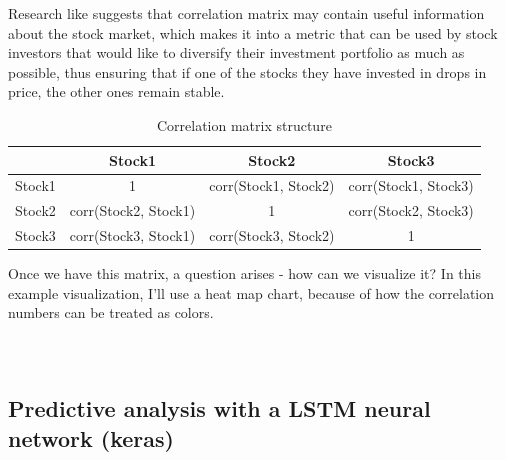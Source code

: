 \documentclass[12pt, a4paper]{article}
\begin{document}
Research like \cite{kwapien2006bulk} suggests that correlation matrix may contain useful information about the stock market, which makes it into a metric that can be used by stock investors that would like to diversify their investment portfolio as much as possible, thus ensuring that if one of the stocks they have invested in drops in price, the other ones remain stable.

\begin{table}[h!]
\centering
\caption{Correlation matrix structure}
\begin{tabular}{ | c | c | c | c | }
  \hline
  \ & Stock1 & Stock2 & Stock3 \\
  \hline
  Stock1 & 1 & corr(Stock1, Stock2) & corr(Stock1, Stock3) \\
  \hline
  Stock2 & corr(Stock2, Stock1) & 1 & corr(Stock2, Stock3) \\
  \hline
  Stock3 & corr(Stock3, Stock1) & corr(Stock3, Stock2) & 1 \\
  \hline
\end{tabular}
\label{table:corr}
\end{table}

Once we have this matrix, a question arises - how can we visualize it? In this example visualization, I'll use a heat map chart, because of how the correlation numbers can be treated as colors.

\bgroup
  \inputminted[linenos, breaklines=true, fontsize=\scriptsize]{python}{src/stocks/corr/1_get_data.py}
  \label{listing:scorr_1}
\egroup


\bgroup
  \inputminted[linenos, breaklines=true, fontsize=\scriptsize, firstnumber=last]{python}{src/stocks/corr/2_problem_labels.py}
  \label{listing:scorr_2}
\egroup

\bgroup
  \inputminted[linenos, breaklines=true, fontsize=\scriptsize, firstnumber=last]{python}{src/stocks/corr/3_fix.py}
  \label{listing:scorr_3}
\egroup

\newpage
\subsection{Predictive analysis with a LSTM neural network (keras)}
\end{document}
